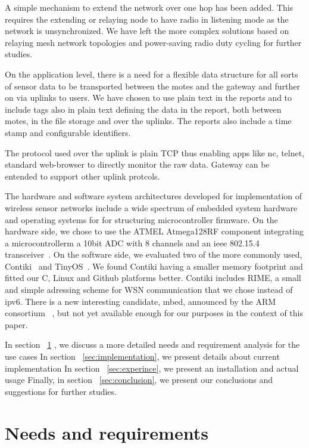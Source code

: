 \documentclass[conference, a4paper,10pt,twocolumn]{IEEEtran}
\begin{document}
A simple mechanism to extend the network over one hop has been added.
This requires the extending or relaying node to have radio in listening 
mode as the network is unsynchronized. We have left the more complex 
solutions based on relaying mesh network topologies and power-saving 
radio duty cycling for further studies.

On the application level, there is a need for a flexible data structure 
for all sorts of sensor data to be transported between the motes and the 
gateway and further on via uplinks to users. We have chosen to use plain 
text in the reports and to include tags also in plain text defining the 
data in the report, both between motes, in the file storage and over the 
uplinks. The reports also include a time stamp and configurable 
identifiers. 

The protocol used over the uplink is plain TCP thus enabling apps like 
nc, telnet, standard web-browser to directly monitor the raw data.
Gateway can be entended to support other uplink protcols.

The hardware and software system architectures developed for 
implementation of wireless sensor networks include a wide spectrum of 
embedded system hardware and operating systems for for structuring 
microcontroller firmware.
On the hardware side, we chose to use the ATMEL Atmega128RF component 
integrating a microcontrollerm a 10bit ADC with 8 channels and an ieee 
802.15.4 transceiver~\cite{ATMEGA}.
On the software side, we evaluated two of the more commonly used, 
Contiki~\cite{CONTIKI} and TinyOS~\cite{tinyos}. We found Contiki having 
a smaller memory footprint and fitted our C, Linux and Github platforms 
better. Contiki includes RIME, a small and simple adressing scheme for 
WSN communication that we chose instead of ipv6. There is a new 
interesting candidate, mbed, announced by the ARM consortium 
~\cite{mbed}, but not yet available enough for our purposes in the 
context of this paper.


In section ~\ref{sec:needs} , we discuss a more detailed needs and requirement analysis for the use cases
In section ~\ref{sec:implementation}, we present details about current implementation  
In section ~\ref{sec:experince}, we present an installation and actual usage
Finally, in section ~\ref{sec:conclusion}, we present our conclusions and suggestions for further studies.
\section{Needs and requirements}
\label{sec:needs}
\end{document}
